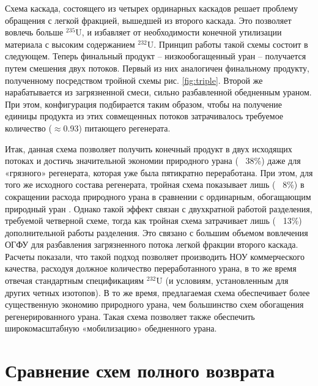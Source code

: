 Схема каскада, состоящего из четырех ординарных каскадов решает проблему обращения с легкой фракцией, вышедшей из второго каскада.
Это позволяет вовлечь больше $^{235}$U, и избавляет от необходимости конечной утилизации материала с высоким содержанием $^{232}$U.
Принцип работы такой схемы состоит в следующем.
Теперь финальный продукт -- низкообогащенный уран -- получается путем смешения двух потоков.
Первый из них аналогичен финальному продукту, полученному посредством тройной схемы рис. \ref{fig:triple}.
Второй же нарабатывается из загрязненной смеси, сильно разбавленной обедненным ураном.
При этом, конфигурация подбирается таким образом, чтобы на получение единицы продукта из этих совмещенных потоков затрачивалось требуемое количество ($\approx$0.93) питающего регенерата.

Итак, данная схема позволяет получить конечный продукт в двух исходящих потоках и достичь значительной экономии природного урана (~ 38\%) даже для «грязного» регенерата, которая уже была пятикратно переработана.
При этом, для того же исходного состава регенерата, тройная схема показывает лишь (~ 8\%) в сокращении расхода природного урана в сравнении с ординарным, обогащающим природный уран \cite{smirnovObogashchenieRegenerirovannogoUrana2018}.
Однако такой эффект связан с двухкратной работой разделения, требуемой четверной схеме, тогда как тройная схема затрачивает лишь (~ 13\%) дополнительной работы разделения.
Это связано с большим объемом вовлечения ОГФУ для разбавления загрязненного потока легкой фракции второго каскада.
Расчеты показали, что такой подход позволяет производить НОУ коммерческого качества, расходуя должное количество переработанного урана, в то же время отвечая стандартным спецификациям $^{232}$U (и условиям, установленным для других четных изотопов).
В то же время, предлагаемая схема обеспечивает более существенную экономию природного урана, чем большинство схем обогащения регенерированного урана.
Такая схема позволяет также обеспечить широкомасштабную «мобилизацию» обедненного урана.

\section{Сравнение схем полного возврата}

